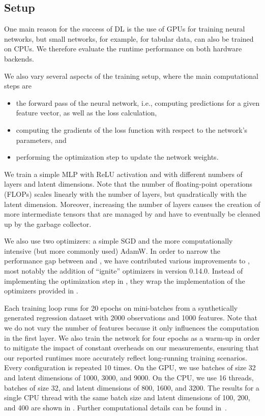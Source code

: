 \documentclass[article,shortnames]{jss}
\theoremstyle{definition}
\begin{document}
\subsection{Setup}
One main reason for the success of DL is the use of GPUs for training neural networks, but small networks, for example, for tabular data, can also be trained on CPUs.
We therefore evaluate the runtime performance on both hardware backends.

We also vary several aspects of the training setup, where the main computational steps are
\begin{itemize}
    \item the forward pass of the neural network, i.e., computing predictions for a given feature vector, as well as the loss calculation,
    \item computing the gradients of the loss function with respect to the network's parameters, and
    \item performing the optimization step to update the network weights.
\end{itemize}

We train a simple MLP with ReLU activation and with different numbers of layers and latent dimensions.
Note that the number of floating-point operations (FLOPs) scales linearly with the number of layers, but quadratically with the latent dimension.
Moreover, increasing the number of layers causes the creation of more intermediate tensors that are managed by \rlang{} and have to eventually be cleaned up by the \rlang{} garbage collector.

We also use two optimizers: a simple SGD and the more computationally intensive (but more commonly used) AdamW.
In order to narrow the performance gap between \torch{} and \pytorch{}, we have contributed various improvements to \torch{}, most notably the addition of ``ignite'' optimizers in \torch{} version 0.14.0.
Instead of implementing the optimization step in \rlang{}, they wrap the \cpp{} implementation of the optimizers provided in \libtorch{}.

Each training loop runs for 20 epochs on mini-batches from a synthetically generated regression dataset with 2000 observations and 1000 features.
Note that we do not vary the number of features because it only influences the computation in the first layer.
We also train the network for four epochs as a warm-up in order to mitigate the impact of constant overheads on our measurements, ensuring that our reported runtimes more accurately reflect long-running training scenarios.
Every configuration is repeated 10 times.
On the GPU, we use batches of size 32 and latent dimensions of 1000, 3000, and 9000.
On the CPU, we use 16 threads, batches of size 32, and latent dimensions of 800, 1600, and 3200.
The results for a single CPU thread with the same batch size and latent dimensions of 100, 200, and 400 are shown in .
Further computational details can be found in~.
\end{document}
